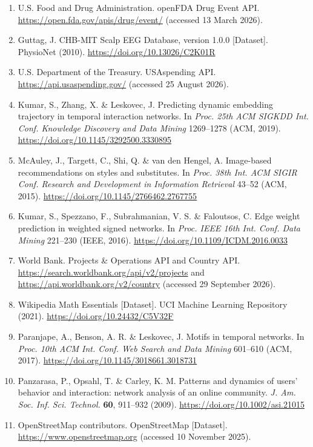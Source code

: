 \documentclass{article}
\begin{document}
\begin{enumerate}[label=S\arabic*.,ref=S\arabic*,leftmargin=2.8em,itemsep=0.6em]
\item \label{src:S11} U.S. Food and Drug Administration. openFDA Drug Event API. \url{https://open.fda.gov/apis/drug/event/} (accessed 13 March 2026).
\item \label{src:S12} Guttag, J. CHB-MIT Scalp EEG Database, version 1.0.0 [Dataset]. PhysioNet (2010). \url{https://doi.org/10.13026/C2K01R}
\item \label{src:S13} U.S. Department of the Treasury. USAspending API. \url{https://api.usaspending.gov/} (accessed 25 August 2026).
\item \label{src:S14} Kumar, S., Zhang, X. \& Leskovec, J. Predicting dynamic embedding trajectory in temporal interaction networks. In \textit{Proc. 25th ACM SIGKDD Int. Conf. Knowledge Discovery and Data Mining} 1269--1278 (ACM, 2019). \url{https://doi.org/10.1145/3292500.3330895}
\item \label{src:S15} McAuley, J., Targett, C., Shi, Q. \& van den Hengel, A. Image-based recommendations on styles and substitutes. In \textit{Proc. 38th Int. ACM SIGIR Conf. Research and Development in Information Retrieval} 43--52 (ACM, 2015). \url{https://doi.org/10.1145/2766462.2767755}
\item \label{src:S16} Kumar, S., Spezzano, F., Subrahmanian, V. S. \& Faloutsos, C. Edge weight prediction in weighted signed networks. In \textit{Proc. IEEE 16th Int. Conf. Data Mining} 221--230 (IEEE, 2016). \url{https://doi.org/10.1109/ICDM.2016.0033}
\item \label{src:S17} World Bank. Projects \& Operations API and Country API. \url{https://search.worldbank.org/api/v2/projects} and \url{https://api.worldbank.org/v2/country} (accessed 29 September 2026).
\item \label{src:S18} Wikipedia Math Essentials [Dataset]. UCI Machine Learning Repository (2021). \url{https://doi.org/10.24432/C5V32F}
\item \label{src:S19} Paranjape, A., Benson, A. R. \& Leskovec, J. Motifs in temporal networks. In \textit{Proc. 10th ACM Int. Conf. Web Search and Data Mining} 601--610 (ACM, 2017). \url{https://doi.org/10.1145/3018661.3018731}
\item \label{src:S20} Panzarasa, P., Opsahl, T. \& Carley, K. M. Patterns and dynamics of users' behavior and interaction: network analysis of an online community. \textit{J. Am. Soc. Inf. Sci. Technol.} \textbf{60}, 911--932 (2009). \url{https://doi.org/10.1002/asi.21015}
\item \label{src:S21} OpenStreetMap contributors. OpenStreetMap [Dataset]. \url{https://www.openstreetmap.org} (accessed 10 November 2025).

\end{enumerate}
\end{document}
